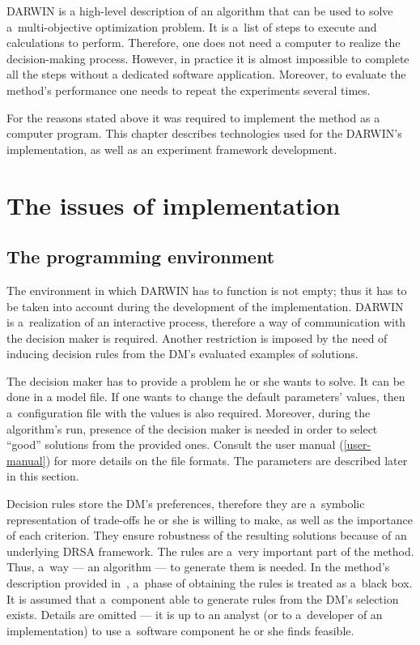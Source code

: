 DARWIN is a high-level description of an algorithm that can be used to solve
a~multi-objective optimization problem. It is a~list of steps to execute and
calculations to perform. Therefore, one does not need a computer to realize
the decision-making process. However, in practice it is almost impossible to
complete all the steps without a dedicated software application. Moreover, to
evaluate the method's performance one needs to repeat the experiments several
times.

For the reasons stated above it was required to implement the method as a
computer program. This chapter describes technologies used for the DARWIN's
implementation, as well as an experiment framework development.

\section{The issues of implementation}

\subsection{The programming environment}
\label{environ}

The environment in which DARWIN has to function is not empty; thus it has to
be taken into account during the development of the implementation. DARWIN is
a~realization of an interactive process, therefore a way of communication with
the decision maker is required. Another restriction is imposed by the need of
inducing decision rules from the DM's evaluated examples of solutions.

The decision maker has to provide a problem he or she wants to solve. It can
be done in a model file. If one wants to change the default parameters'
values, then a~configuration file with the values is also required. Moreover,
during the algorithm's run, presence of the decision maker is needed in order
to select ``good'' solutions from the provided ones. Consult the user manual
(\ref{user-manual}) for more details on the file formats. The parameters are
described later in this section.

Decision rules store the DM's preferences, therefore they are a~symbolic
representation of trade-offs he or she is willing to make, as well as the
importance of each criterion. They ensure robustness of the resulting
solutions because of an underlying DRSA framework. The rules are a~very
important part of the method. Thus, a~way --- an algorithm --- to generate
them is needed. In the method's description provided in~\cite{GMS10, GMS10b,
  GMS10c}, a~phase of obtaining the rules is treated as a~black box. It is
assumed that a~component able to generate rules from the DM's selection
exists. Details are omitted --- it is up to an analyst (or to a~developer of
an implementation) to use a~software component he or she finds feasible.

